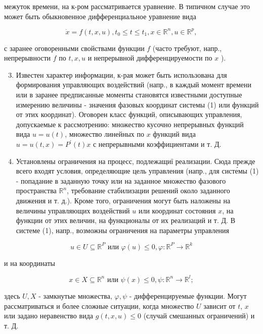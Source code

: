 \documentclass[10pt]{article}
\begin{document}
межуток времени, на к-ром рассматривается уравнение. В типичном случае это может быть обыкновенное дифференциальное уравнение вида

\[
\dot{x}=f(t, x, u), t_{0} \leqslant t \leqslant t_{1}, x \in \mathbb{R}^{n}, u \in \mathbb{R}^{p},
\]

с заранее оговоренными свойствами функции $f$ (часто требуют, напр., непрерывности $f$ по $t, x, u$ и непрерывной дифференцируемости по $x$ ).

\begin{enumerate}
  \setcounter{enumi}{2}
  \item Известен характер информации, к-рая может быть использована для формирования управляющих воздействий (напр., в каждый момент времени или в заранее предписанные моменты становятся известными доступные измерению величины - значения фазовых координат системы (1) или функций от этих координат). Оговорен класс функций, описывающих управления, допускаемые к рассмотрению: множество кусочно непрерывных функций вида $u=u(t)$, множество линейных по $x$ функций вида $u=u(t, x)=P^{\prime}(t) x$ с непрерывными коэффициентами и т. Д.

  \item Установлены ограничения на процесс, подлежащиї реализации. Сюда прежде всего входят условия, определяющие цель управления (напр., для систе́мы (1) - попадание в заданную точку или на заданное множество фазового пространства $\mathbb{R}^{n}$, требование стабилизации решений около заданного движения и т. д.). Кроме того, ограничения могут быть наложены на величины управляющих воздействий $u$ или координат состояния $x$, на функции от этих величин, на функционалы от их реализаций и т. Д. В системе (1), напр., возможны ограничения на параметры управления

\end{enumerate}

\[
u \in U \subseteq \mathbb{R}^{P} \text { или } \varphi(u) \leqslant 0, \varphi: \mathbb{R}^{P} \longrightarrow \mathbb{R}^{k}
\]

и на координаты

\[
x \in X \subseteq \mathbb{R}^{n} \text { или } \psi(x) \leqslant 0, \psi: \mathbb{R}^{n} \rightarrow \mathbb{R}^{l} ;
\]

здесь $U, X$ - замкнутые множества, $\varphi, \psi$ - дифференцируемые функции. Могут рассматриваться и более сложные ситуации, когда множество $U$ зависит от $t$, $x$ или задано неравенство вида $g(t, x, u) \leqslant 0$ (случай смешанных ограничений) и т. Д.
\end{document}

